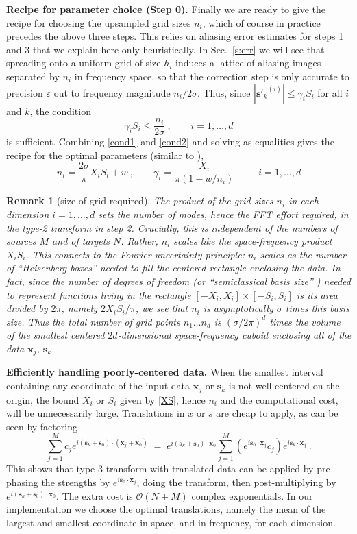 \documentclass[10pt]{article}
\newcommand{\be}{\begin{equation}}
\newcommand{\ee}{\end{equation}}
\newcommand{\mbf}[1]{{\mathbf #1}}
\newcommand{\eps}{\varepsilon}
\newcommand{\bigO}{{\mathcal O}}
\newtheorem{rmk}[thm]{Remark}
\newcommand{\xx}{\mbf{x}}
\newcommand{\sss}{\mbf{s}}
\newcommand{\rat}{\sigma}          %
\begin{document}
{\bf Recipe for parameter choice (Step 0).}
Finally we are ready to give the recipe for choosing the upsampled grid
sizes $n_i$, which of course in practice precedes the above three steps.
This relies on aliasing error estimates \cite{elbel}
for steps 1 and 3 that we explain here only heuristically.
In Sec.~\ref{s:err} we will see that spreading onto a uniform grid
of size $h_i$ induces a lattice of
aliasing images separated by $n_i$ in frequency space,
so that the correction step is only accurate to precision $\eps$ out to
frequency magnitude $n_i/2\rat$.
Thus, since $|{\sss'_k}^{(i)}| \le \gamma_i S_i$ for all $i$ and $k$,
the condition
\be
\gamma_i S_i \le \frac{n_i}{2\rat}
~,\qquad i=1,\dots,d
\label{cond2}
\ee
is sufficient.
Combining \eqref{cond1} and \eqref{cond2} and solving as equalities
gives the recipe for the optimal parameters (similar to \cite[Rmk.~1]{nufft3}),
\be
n_i = \frac{2\rat}{\pi}X_iS_i + w
~,\qquad
\gamma_i = %
\frac{X_i}{\pi(1 - w/n_i)}
~.
\qquad i=1,\dots,d
\label{ng}
\ee
\begin{rmk}[size of grid required]
  The product of the grid sizes $n_i$ in each dimension $i=1,\dots,d$
  sets the number of modes, hence the FFT effort required,
  in the type-2 transform in step 2.
Crucially,  this is independent of the numbers of sources $M$ and of
  targets $N$.
  Rather, $n_i$ scales like the space-frequency product $X_iS_i$.
  This connects to the Fourier uncertainty principle:
  $n_i$ scales as the number of ``Heisenberg boxes''
  \cite{mallatbook} needed to fill the centered rectangle enclosing the data.
  In fact, since the number of degrees of freedom
(or ``semiclassical basis size'' \cite{davisheller})
  needed to represent functions
  living in the rectangle $[-X_i,X_i]\times[-S_i,S_i]$ is its area divided
  by $2\pi$, namely $2X_iS_i/\pi$, we see that
  $n_i$ is asymptotically $\rat$ times this basis size.
  Thus the total number of grid points $n_1\dots n_d$ is $(\rat/2\pi)^d$
  times the volume of the smallest centered $2d$-dimensional space-frequency
  cuboid enclosing all of the data $\xx_j$, $\sss_k$.
  \label{r:heis}
\end{rmk}

{\bf Efficiently handling poorly-centered data.}
When the smallest interval containing any coordinate of the input data
$\xx_j$ or $\sss_k$
is not well centered on the origin, the bound $X_i$ or $S_i$ given
by \eqref{XS}, hence $n_i$ and the computational cost,
will be unnecessarily large.
Translations in $x$ or $s$ are cheap to apply,
as can be seen by factoring
\be
\sum_{j=1}^M c_j e^{i (\sss_k+\sss_0) \cdot (\xx_j+\xx_0)}
\;= \;
e^{i(\sss_k+\sss_0)\cdot\xx_0} \sum_{j=1}^M (e^{i\sss_0\cdot \xx_j}c_j) e^{i \sss_k\cdot\xx_j}~.
\label{trans}
\ee
This shows that type-3 transform with translated data
can be applied by pre-phasing the strengths by $e^{i\sss_0\cdot \xx_j}$,
doing the transform, then post-multiplying by $e^{i(\sss_k+\sss_0)\cdot\xx_0}$.
The extra cost is $\bigO(N+M)$ complex exponentials.
In our implementation we
choose the optimal translations, namely the mean of the largest and
smallest coordinate in space, and in frequency, for each dimension.
\end{document}
